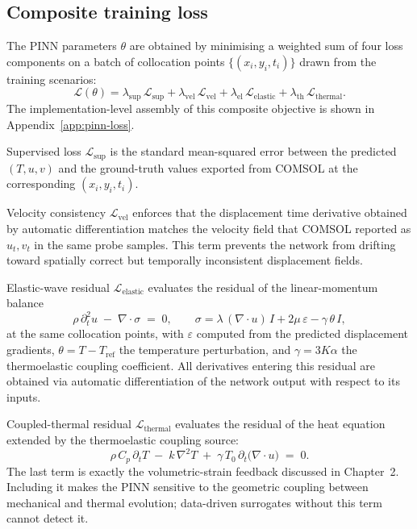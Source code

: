 \subsection{Composite training loss}

The PINN parameters $\theta$ are obtained by minimising a weighted sum
of four loss components on a batch of collocation points
$\{(x_i, y_i, t_i)\}$ drawn from the training scenarios:
\begin{equation}
\mathcal{L}(\theta)
=
\lambda_{\mathrm{sup}}\,\mathcal{L}_{\mathrm{sup}}
+ \lambda_{\mathrm{vel}}\,\mathcal{L}_{\mathrm{vel}}
+ \lambda_{\mathrm{el}}\,\mathcal{L}_{\mathrm{elastic}}
+ \lambda_{\mathrm{th}}\,\mathcal{L}_{\mathrm{thermal}}.
\end{equation}
The implementation-level assembly of this composite objective is shown
in Appendix~\ref{app:pinn-loss}.

Supervised loss $\mathcal{L}_{\mathrm{sup}}$ is the standard
mean-squared error between the predicted $(T,u,v)$ and the
ground-truth values exported from COMSOL at the corresponding
$(x_i,y_i,t_i)$.

Velocity consistency $\mathcal{L}_{\mathrm{vel}}$ enforces
that the displacement time derivative obtained by automatic
differentiation matches the velocity field that COMSOL reported as
$u_t,v_t$ in the same probe samples. This term prevents the network
from drifting toward spatially correct but temporally inconsistent
displacement fields.

Elastic-wave residual $\mathcal{L}_{\mathrm{elastic}}$
evaluates the residual of the linear-momentum balance
\begin{equation}
\rho\,\partial_t^2 u
\;-\;
\nabla\!\cdot\!\sigma
\;=\;0,
\qquad
\sigma
= \lambda\,(\nabla\!\cdot\!u)\,I
+ 2\mu\,\varepsilon
- \gamma\,\theta\,I,
\end{equation}
at the same collocation points, with $\varepsilon$ computed from the
predicted displacement gradients, $\theta = T - T_{\mathrm{ref}}$ the
temperature perturbation, and $\gamma = 3K\alpha$ the thermoelastic
coupling coefficient. All derivatives entering this residual are
obtained via automatic differentiation of the network output with
respect to its inputs.

Coupled-thermal residual $\mathcal{L}_{\mathrm{thermal}}$
evaluates the residual of the heat equation extended by the
thermoelastic coupling source:
\begin{equation}
\rho\,C_p\,\partial_t T
\;-\;
k\,\nabla^2 T
\;+\;
\gamma\,T_0\,\partial_t\!\bigl(\nabla\!\cdot\!u\bigr)
\;=\;0.
\end{equation}
The last term is exactly the volumetric-strain feedback discussed in
Chapter~2. Including it makes the PINN sensitive to the geometric
coupling between mechanical and thermal evolution; data-driven
surrogates without this term cannot detect it.

